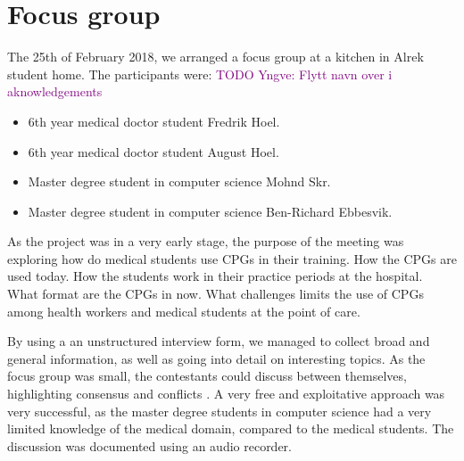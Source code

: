 \section{Focus group}
The 25th of February 2018, we arranged a focus group at a kitchen in Alrek student home. The participants were:
\textcolor{purple}{TODO Yngve: Flytt navn over i aknowledgements}
\begin{itemize}
	\item 6th year medical doctor student Fredrik Hoel.
	\item 6th year medical doctor student August Hoel.
	\item Master degree student in computer science Mohnd Skr.
	\item Master degree student in computer science Ben-Richard Ebbesvik.
\end{itemize}

As the project was in a very early stage, the purpose of the meeting was exploring how do medical students use CPGs in their training. How the CPGs are used today. How the students work in their practice periods at the hospital. What format are the CPGs in now. What challenges limits the use of CPGs among health workers and medical students at the point of care.

By using a an unstructured interview form, we managed to collect broad and general information, as well as going into detail on interesting topics. As the focus group was small, the contestants could discuss between themselves, highlighting consensus and conflicts \parencite{Preece2015}. A very free and exploitative approach was very successful, as the master degree students in computer science had a very limited knowledge of the medical domain, compared to the medical students. The discussion was documented using an audio recorder.

